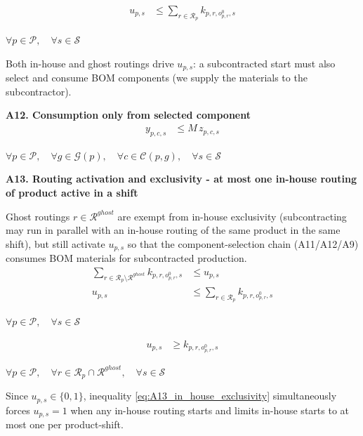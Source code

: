\documentclass{article}
\begin{document}
\begin{align}
u_{p,s}
&\le
\sum_{r \in \mathcal{R}_p}
k_{p,r,o^0_{p,r},s}
\end{align}
\begin{center}
$\forall p \in \mathcal{P}, \quad
\forall s \in \mathcal{S}$
\end{center}

Both in-house and ghost routings drive $u_{p,s}$: a subcontracted start must also select and consume BOM components (we supply the materials to the subcontractor).

\noindent\textbf{A12. Consumption only from selected component}
\begin{align}
y_{p,c,s}
&\le
M \, z_{p,c,s}
\label{eq:A12_selected_component}
\end{align}
\begin{center}
$\forall p \in \mathcal{P}, \quad
\forall g \in \mathcal{G}(p), \quad
\forall c \in \mathcal{C}(p,g), \quad
\forall s \in \mathcal{S}$
\end{center}

\noindent\textbf{A13. Routing activation and exclusivity - at most one in-house routing of product active in a shift}

Ghost routings $r \in \mathcal{R}^{ghost}$ are exempt from in-house exclusivity (subcontracting may run in parallel with an in-house routing of the same product in the same shift), but still activate $u_{p,s}$ so that the component-selection chain (A11/A12/A9) consumes BOM materials for subcontracted production.
\begin{align}
\sum_{r \in \mathcal{R}_p \setminus \mathcal{R}^{ghost}}
k_{p,r,o^0_{p,r},s}
&\le
u_{p,s}
\label{eq:A13_in_house_exclusivity}
\\
u_{p,s}
&\le
\sum_{r \in \mathcal{R}_p}
k_{p,r,o^0_{p,r},s}
\label{eq:A13_u_upper}
\end{align}
\begin{center}
$\forall p \in \mathcal{P}, \quad
\forall s \in \mathcal{S}$
\end{center}

\begin{align}
u_{p,s}
&\ge
k_{p,r,o^0_{p,r},s}
\label{eq:A13_ghost_activation}
\end{align}
\begin{center}
$\forall p \in \mathcal{P}, \quad
\forall r \in \mathcal{R}_p \cap \mathcal{R}^{ghost}, \quad
\forall s \in \mathcal{S}$
\end{center}

Since $u_{p,s} \in \{0,1\}$, inequality \eqref{eq:A13_in_house_exclusivity} simultaneously forces $u_{p,s}=1$ when any in-house routing starts and limits in-house starts to at most one per product-shift.
\end{document}
